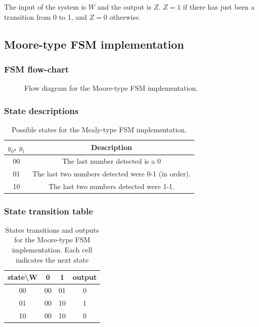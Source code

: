 \documentclass[../../e3_tp3_main.tex]{subfiles}
\begin{document}
\chapter{}

The input of the system is $W$ and the output is $Z$. $Z=1$ if there has just been a transition from 0 to 1, and $Z=0$ otherwise. 

\section{Moore-type FSM implementation}
\subsection{FSM flow-chart}
\begin{figure}[H]
	\centering
	
	\caption{Flow diagram for the Moore-type FSM implementation.}
\end{figure}

\subsection{State descriptions}
\begin{table}[H]	%
	\centering
	\begin{tabular}{|c|c|}
	\hline	
	$y_0$, $y_1$  & Description\\	
	\hline 
	00 & The last number detected is a 0\\ 
	\hline 
	01 & The last two numbers detected were 0-1 (in order).\\ 
	\hline 
	10 & The last two numbers detected were 1-1.\\ 
	\hline
	
	\end{tabular} 
	\caption{Possible states for the Mealy-type FSM implementation.}
	\label{tab:ej3_moore_states}
\end{table}


\subsection{State transition table}
\begin{table}[H]	%
	\centering
		\begin{tabular}{|c|c|c|c|}
		\hline 
		state\textbackslash W & 0 & 1 & output\\ 
		\hline 
		00 & 00 & 01 & 0\\ 
		\hline 
		01 & 00 & 10 & 1\\ 
		\hline 
		10 & 00 & 10 & 0\\ 
		\hline 
		\end{tabular} 
	\caption[States transitions and outputs for the Moore-type FSM implementation]{States transitions and outputs for the Moore-type FSM implementation. Each cell indicates the next state}
	\label{tab:ej3_moore_transitions}
\end{table}
\end{document}
